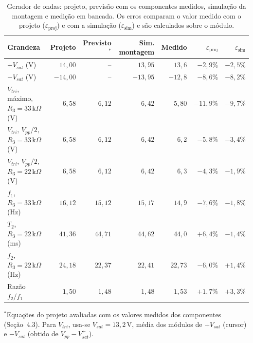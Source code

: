 \documentclass[11pt,a4paper]{article}
\begin{document}
\begin{table}[H]
\centering
\caption{Gerador de ondas: projeto, previsão com os componentes medidos, simulação da montagem e medição em bancada. Os erros comparam o valor medido com o projeto ($\varepsilon_{\text{proj}}$) e com a simulação ($\varepsilon_{\text{sim}}$) e são calculados sobre o módulo.}
\label{tab:bancada_gerador}
\small
\setlength{\tabcolsep}{5pt}
\begin{tabular}{@{}lrrrrrr@{}}
\toprule
\textbf{Grandeza} & \textbf{Projeto} & \textbf{Previsto}$^{\ast}$ & \textbf{Sim. montagem} & \textbf{Medido} & $\varepsilon_{\text{proj}}$ & $\varepsilon_{\text{sim}}$ \\
\midrule
$+V_{sat}$ (V) & $14{,}00$ & -- & $13{,}95$ & $13{,}6$ & $-2{,}9\%$ & $-2{,}5\%$ \\
$-V_{sat}$ (V) & $-14{,}00$ & -- & $-13{,}95$ & $-12{,}8$ & $-8{,}6\%$ & $-8{,}2\%$ \\
$V_{tri}$, máximo, $R_3 = 33\,\text{k}\Omega$ (V) & $6{,}58$ & $6{,}12$ & $6{,}42$ & $5{,}80$ & $-11{,}9\%$ & $-9{,}7\%$ \\
$V_{tri}$, $V_{pp}/2$, $R_3 = 33\,\text{k}\Omega$ (V) & $6{,}58$ & $6{,}12$ & $6{,}42$ & $6{,}2$ & $-5{,}8\%$ & $-3{,}4\%$ \\
$V_{tri}$, $V_{pp}/2$, $R_3 = 22\,\text{k}\Omega$ (V) & $6{,}58$ & $6{,}12$ & $6{,}42$ & $6{,}3$ & $-4{,}3\%$ & $-1{,}9\%$ \\
$f_1$, $R_3 = 33\,\text{k}\Omega$ (Hz) & $16{,}12$ & $15{,}12$ & $15{,}17$ & $14{,}9$ & $-7{,}6\%$ & $-1{,}8\%$ \\
$T_2$, $R_3 = 22\,\text{k}\Omega$ (ms) & $41{,}36$ & $44{,}71$ & $44{,}62$ & $44{,}0$ & $+6{,}4\%$ & $-1{,}4\%$ \\
$f_2$, $R_3 = 22\,\text{k}\Omega$ (Hz) & $24{,}18$ & $22{,}37$ & $22{,}41$ & $22{,}73$ & $-6{,}0\%$ & $+1{,}4\%$ \\
Razão $f_2/f_1$ & $1{,}50$ & $1{,}48$ & $1{,}48$ & $1{,}53$ & $+1{,}7\%$ & $+3{,}3\%$ \\
\bottomrule
\end{tabular}

\vspace{4pt}
\begin{minipage}{0.95\linewidth}
\footnotesize $^{\ast}$Equações do projeto avaliadas com os valores medidos dos componentes (Seção~4.3). Para $V_{tri}$, usa-se $V_{sat} = 13{,}2\,\text{V}$, média dos módulos de $+V_{sat}$ (cursor) e $-V_{sat}$ (obtido de $V_{pp} - V_{sat}^{+}$).
\end{minipage}
\end{table}
\end{document}
